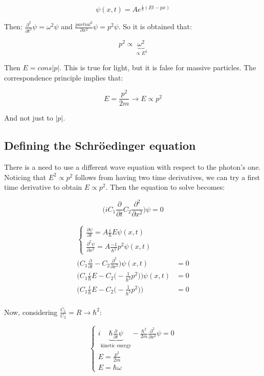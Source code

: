   $$\psi(x,t) = Ae^{\frac{i}{\hbar}(Et -px)}$$


  Then: $\frac{\partial^2{}}{\partial{t^2}}\psi = \omega^2\psi$ and $\frac{partial^2}{\partial x^2}\psi = p^2\psi$.
  So it is obtained that:

  $${p^2}\propto\underbrace{\omega^2}_{\propto E^2}$$

  Then $E = cons|p|$.
  This is true for light, but it is false for massive particles. The correspondence principle implies that:

  $$E = \frac{p^2}{2m}\rightarrow E\propto p^2$$

  And not just to $|p|$.

  \subsection{Defining the Schr\"oedinger equation}
  There is a need to use a different wave equation with respect to the photon's one.
  Noticing that $E^2\propto p^2$ follows from having two time derivatives, we can try a first time derivative to obtain $E\propto p^2$.
  Then the equation to solve becomes:

  $$\biggl(iC_1\frac{\partial}{\partial t} C_2\frac{\partial^2}{\partial x^2}\biggr)\psi = 0$$

  \begin{align*}
    \begin{cases}\frac{\partial\psi}{\partial t} = A\frac{i}{\hbar}E\psi(x,t)\\\frac{\partial^2\psi}{\partial x^2} = A\frac{-1}{\hbar^2}p^2\psi(x,t)\end{cases}\\
    \biggl(C_1\frac{\partial}{\partial t} - C_2\frac{\partial^2}{\partial x^2}\biggr)\psi(x,t) &=0\\
    \biggl(C_1\frac{i}{\hbar}E-C_2\bigl(-\frac{1}{\hbar^2}p^2\bigr)\biggr)\psi(x,t) &= 0\\
    \biggl(C_1\frac{i}{\hbar}E-C_2\bigl(-\frac{1}{\hbar^2}p^2\bigr)\biggr) &= 0\\
  \end{align*}

  Now, considering $\frac{C_1}{C_2}=R\rightarrow \hbar^2$:

  $$\begin{cases} i\underbrace{\hbar\frac{\partial}{\partial t}\psi}_{\text{kinetic energy}}-\frac{\hbar^2}{2m}\frac{\partial^2}{\partial x^2}\psi = 0\\E =\frac{p^2}{2m}\\E = \hbar\omega\end{cases}$$

